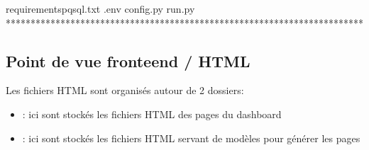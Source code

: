 \documentclass[letterpaper,10pt,french]{sphinxmanual}
\begin{document}
\begin{sphinxVerbatim}[commandchars=\\\{\}]
\PYGZhy{}\PYGZhy{} requirements\PYGZhy{}pqsql.txt                    
\PYGZhy{}\PYGZhy{} .env                                      
\PYGZhy{}\PYGZhy{} config.py                                 
\PYGZhy{}\PYGZhy{} run.py                                    
\PYGZhy{}\PYGZhy{} ************************************************************************
\end{sphinxVerbatim}


\subsection{Point de vue fronte\sphinxhyphen{}end / HTML}
\label{\detokenize{infrastructure:point-de-vue-fronte-end-html}}
\sphinxAtStartPar
Les fichiers HTML sont organisés autour de 2 dossiers:
\begin{itemize}
\item {} 
\sphinxAtStartPar
{} : ici sont stockés les fichiers HTML des pages du dashboard

\item {} 
\sphinxAtStartPar
{} : ici sont stockés les fichiers HTML servant de modèles pour générer les pages

\end{itemize}
\end{document}
